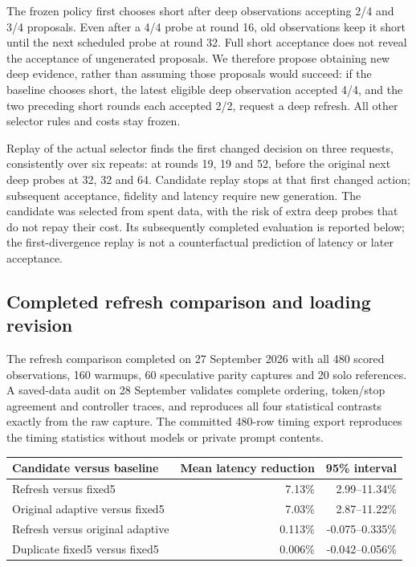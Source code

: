 \documentclass[
  11pt,
]{article}
\newcounter{none} %
\begin{document}
The frozen policy first chooses short after deep observations accepting
2/4 and 3/4 proposals. Even after a 4/4 probe at round 16, old
observations keep it short until the next scheduled probe at round 32.
Full short acceptance does not reveal the acceptance of ungenerated
proposals. We therefore propose obtaining new deep evidence, rather than
assuming those proposals would succeed: if the baseline chooses short,
the latest eligible deep observation accepted 4/4, and the two preceding
short rounds each accepted 2/2, request a deep refresh. All other
selector rules and costs stay frozen.

Replay of the actual selector finds the first changed decision on three
requests, consistently over six repeats: at rounds 19, 19 and 52, before
the original next deep probes at 32, 32 and 64. Candidate replay stops
at that first changed action; subsequent acceptance, fidelity and
latency require new generation. The candidate was selected from spent
data, with the risk of extra deep probes that do not repay their cost.
Its subsequently completed evaluation is reported below; the
first-divergence replay is not a counterfactual prediction of latency or
later acceptance.

\subsection{Completed refresh comparison and loading
revision}\label{completed-refresh-comparison-and-loading-revision}

The refresh comparison completed on 27 September 2026 with all 480
scored observations, 160 warmups, 60 speculative parity captures and 20
solo references. A saved-data audit on 28 September validates complete
ordering, token/stop agreement and controller traces, and reproduces all
four statistical contrasts exactly from the raw capture. The committed
480-row timing export reproduces the timing statistics without models or
private prompt contents.

{\def\LTcaptype{none} %
\begin{longtable}[]{@{}lrr@{}}
\toprule\noalign{}
Candidate versus baseline & Mean latency reduction & 95\% interval \\
\midrule\noalign{}
\endhead
\bottomrule\noalign{}
\endlastfoot
Refresh versus fixed5 & 7.13\% & 2.99--11.34\% \\
Original adaptive versus fixed5 & 7.03\% & 2.87--11.22\% \\
Refresh versus original adaptive & 0.113\% & -0.075--0.335\% \\
Duplicate fixed5 versus fixed5 & 0.006\% & -0.042--0.056\% \\
\end{longtable}
}
\end{document}
